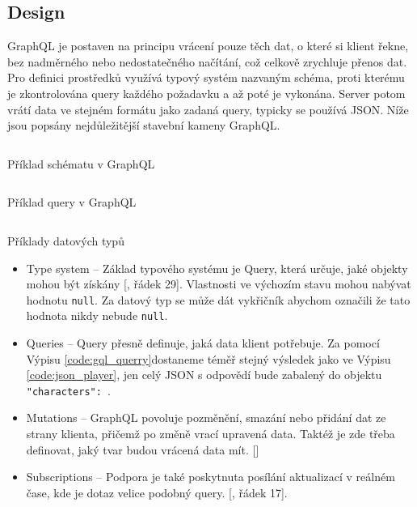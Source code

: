 \subsection{Design}
GraphQL je postaven na principu vrácení pouze těch dat, o které si klient řekne, bez nadměrného nebo nedostatečného načítání, což celkově zrychluje přenos dat. Pro definici prostředků využívá typový systém nazvaným schéma, proti kterému je zkontrolována query každého požadavku a až poté je vykonána. Server potom vrátí data ve stejném formátu jako zadaná query, typicky se používá JSON. Níže jsou popsány nejdůležitější stavební kameny GraphQL. \cite{enwiki:1219709983} \cite{graphqlOfficial}

\begin{listing}[ht!]
    \inputminted[]{ts}{resources/code/standards/playertype.gql}
    \caption{Příklad schématu v GraphQL}
    \label{code:gql_type}
\end{listing}

\begin{listing}[ht!]
    \inputminted[]{graphql}{resources/code//standards/playerquery.gql}
    \caption{Příklad query v GraphQL}
    \label{code:gql_querry}
\end{listing}


\begin{listing}[ht!]
    \inputminted[]{graphql}{resources/code/standards/types.example.gql}
    \caption{Příklady datových typů}
    \label{code:gql_datatypes}
\end{listing}

\begin{itemize}
    \item Type system  -- Základ typového systému je Query, která určuje, jaké objekty mohou být získány [, řádek 29]. Vlastnosti ve výchozím stavu mohou nabývat hodnotu \texttt{null}. Za datový typ se může dát vykřičník abychom označili že tato hodnota nikdy nebude \texttt{null}.
    \item Queries  -- Query přesně definuje, jaká data klient potřebuje. Za pomocí Výpisu \ref{code:gql_querry}dostaneme téměř stejný výsledek jako ve Výpisu \ref{code:json_player}, jen celý JSON s odpovědí bude zabalený do objektu \texttt{"characters": {}}.
    \item Mutations  -- GraphQL povoluje pozměnění, smazání nebo přidání dat ze strany klienta, přičemž po změně vrací upravená data. Taktéž je zde třeba definovat, jaký tvar budou vrácená data mít. []
    \item Subscriptions  -- Podpora je také poskytnuta posílání aktualizací v reálném čase, kde je dotaz velice podobný query. [, řádek 17].
\end{itemize}

